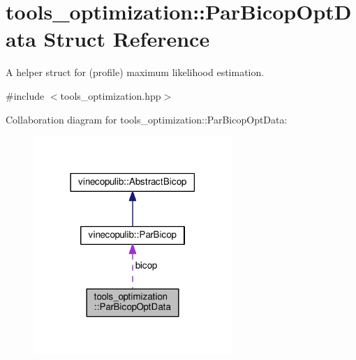\hypertarget{structtools__optimization_1_1_par_bicop_opt_data}{}\section{tools\+\_\+optimization\+:\+:Par\+Bicop\+Opt\+Data Struct Reference}
\label{structtools__optimization_1_1_par_bicop_opt_data}


A helper struct for (profile) maximum likelihood estimation.  




{\ttfamily \#include $<$tools\+\_\+optimization.\+hpp$>$}



Collaboration diagram for tools\+\_\+optimization\+:\+:Par\+Bicop\+Opt\+Data\+:\nopagebreak
\begin{figure}[H]
\begin{center}
\leavevmode
\includegraphics[width=213pt]{structtools__optimization_1_1_par_bicop_opt_data__coll__graph}
\end{center}
\end{figure}

